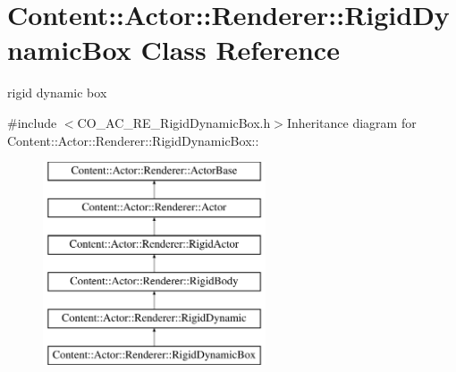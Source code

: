 \hypertarget{classContent_1_1Actor_1_1Renderer_1_1RigidDynamicBox}{
\section{Content::Actor::Renderer::RigidDynamicBox Class Reference}
\label{classContent_1_1Actor_1_1Renderer_1_1RigidDynamicBox}
}


rigid dynamic box  


{\ttfamily \#include $<$CO\_\-AC\_\-RE\_\-RigidDynamicBox.h$>$}Inheritance diagram for Content::Actor::Renderer::RigidDynamicBox::\begin{figure}[H]
\begin{center}
\leavevmode
\includegraphics[height=6cm]{classContent_1_1Actor_1_1Renderer_1_1RigidDynamicBox}
\end{center}
\end{figure}
